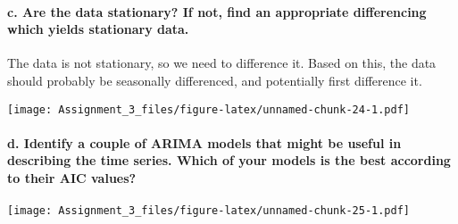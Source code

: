 \documentclass[]{article}
\newenvironment{Shaded}{\begin{snugshade}}{\end{snugshade}}
\newcommand{\KeywordTok}[1]{\textcolor[rgb]{0.13,0.29,0.53}{\textbf{#1}}}
\newcommand{\DataTypeTok}[1]{\textcolor[rgb]{0.13,0.29,0.53}{#1}}
\newcommand{\DecValTok}[1]{\textcolor[rgb]{0.00,0.00,0.81}{#1}}
\newcommand{\StringTok}[1]{\textcolor[rgb]{0.31,0.60,0.02}{#1}}
\newcommand{\OperatorTok}[1]{\textcolor[rgb]{0.81,0.36,0.00}{\textbf{#1}}}
\newcommand{\NormalTok}[1]{#1}
\let\oldparagraph\paragraph
\renewcommand{\paragraph}[1]{\oldparagraph{#1}\mbox{}}
\begin{document}
\paragraph{c. Are the data stationary? If not, find an appropriate
differencing which yields stationary
data.}\label{c.-are-the-data-stationary-if-not-find-an-appropriate-differencing-which-yields-stationary-data.}

The data is not stationary, so we need to difference it. Based on this,
the data should probably be seasonally differenced, and potentially
first difference it.

\begin{Shaded}
\end{Shaded}

\texttt{[image: Assignment\_3\_files/figure-latex/unnamed-chunk-24-1.pdf]}

\paragraph{d. Identify a couple of ARIMA models that might be useful in
describing the time series. Which of your models is the best according
to their AIC
values?}\label{d.-identify-a-couple-of-arima-models-that-might-be-useful-in-describing-the-time-series.-which-of-your-models-is-the-best-according-to-their-aic-values}

\begin{Shaded}
\end{Shaded}

\texttt{[image: Assignment\_3\_files/figure-latex/unnamed-chunk-25-1.pdf]}

\begin{Shaded}
\end{Shaded}
\end{document}
